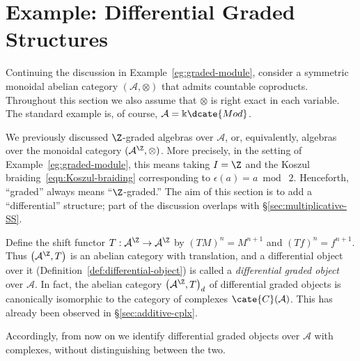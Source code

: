 
\section{Example: Differential Graded Structures}\label{sec:dga-monoidal}
\hypertarget{o014.aljabr2.chapter7.differential-graded-structures}{ }
Continuing the discussion in Example~\ref{eg:graded-module}, consider a
symmetric monoidal abelian category $(\mathcal{A}, \otimes)$ that admits
countable coproducts. Throughout this section we also assume that $\otimes$
is right exact in each variable. The standard example is, of course,
$\mathcal{A}=\Bbbk\dcate{Mod}$.

We previously discussed $\Z$-graded algebras over $\mathcal{A}$, or,
equivalently, algebras over the monoidal category
$(\mathcal{A}^{\Z},\otimes)$. More precisely, in the setting of
Example~\ref{eg:graded-module}, this means taking $I=\Z$ and the Koszul
braiding~\eqref{eqn:Koszul-braiding} corresponding to
$\epsilon(a)=a\bmod\;2$. Henceforth, “graded” always means
“$\Z$-graded.” The aim of this section is to add a “differential” structure;
part of the discussion overlaps with \S\ref{sec:multiplicative-SS}.

Define the shift functor $T:\mathcal{A}^{\Z}\to\mathcal{A}^{\Z}$ by
$(TM)^n=M^{n+1}$ and $(Tf)^n=f^{n+1}$. Thus
$\left(\mathcal{A}^{\Z},T\right)$ is an abelian category with translation,
and a differential object over it (Definition~\ref{def:differential-object})
is called a \emph{differential graded object} over $\mathcal{A}$. In fact,
the abelian category $\left(\mathcal{A}^{\Z},T\right)_d$ of differential
graded objects is canonically isomorphic to the category of complexes
$\cate{C}(\mathcal{A})$. This has already been observed in
\S\ref{sec:additive-cplx}.

Accordingly, from now on we identify differential graded objects over
$\mathcal{A}$ with complexes, without distinguishing between the two.

